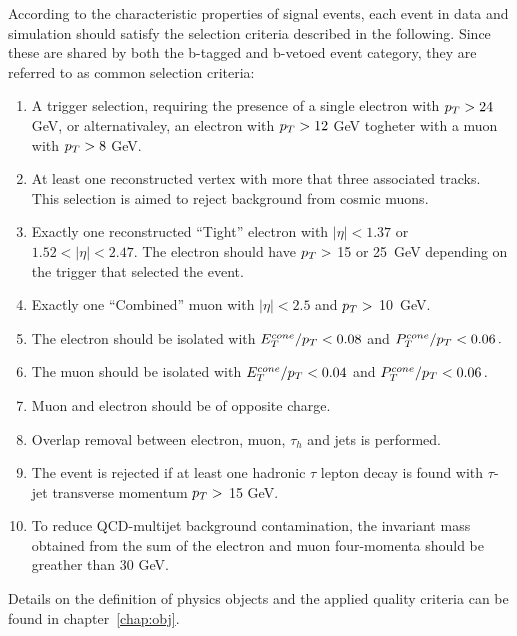 According to the characteristic properties of signal events, each event in data and simulation should satisfy
the selection criteria described in the following. Since these are shared by both the b-tagged and b-vetoed event category,
they are referred to as common selection criteria:


\begin{enumerate}[label=(\roman*)]
\item A trigger selection, requiring the presence of a single electron with $p_{T} > 24$ GeV, or alternativaley,
	an electron with  $p_{T} > 12$ GeV togheter with a muon with  $p_{T} > 8$ GeV. 

\item At least one reconstructed vertex with more that three associated tracks. This selection is aimed to 
	reject background from cosmic muons.

\item Exactly one reconstructed ``Tight'' electron with $|\eta| < 1.37 $ or $1.52 < |\eta| < 2.47$.
	The electron  should have $p_{T} > $ 15 or 25~GeV depending on the trigger that selected the event. 

\item Exactly one ``Combined'' muon with $|\eta| < 2.5$ and  $p_{T} > $ 10~GeV.

\item The electron should be isolated with $E_T^{cone}/ p_{T} < 0.08$ and $P_T^{cone}/ p_{T} < 0.06\,.$ 

\item The muon should be isolated with  $E_T^{cone}/ p_{T} < 0.04$ and $P_T^{cone}/ p_{T} <  0.06\,.$ 

\item Muon and electron should be of opposite charge.

\item Overlap removal between electron, muon, $\tau_h$ and jets is performed.

\item The event is rejected if at least one hadronic $\tau$ lepton decay is found with  $\tau$-jet transverse 
	momentum  $p_{T} > $ 15 GeV.

\item To reduce QCD-multijet background contamination, the invariant mass obtained from the sum 
	of the electron and muon four-momenta should be greather than 30 GeV.

\end{enumerate}
Details on  the definition of physics objects and the applied quality criteria  can be found in  chapter~\ref{chap:obj}.

